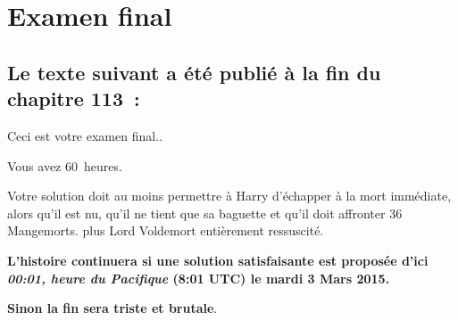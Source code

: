 \chapter{Examen final}

\section{Le texte suivant a été publié à la fin du chapitre 113~:}


\setlength{\parskip}{.5\baselineskip}

Ceci est votre examen final..

Vous avez 60~heures.

Votre solution doit au moins permettre à Harry d'échapper à la mort immédiate,
alors qu'il est nu, qu'il ne tient que sa baguette et qu'il doit affronter 36 Mangemorts.
plus Lord Voldemort entièrement ressuscité.

\textbf{L'histoire continuera si une solution satisfaisante est proposée d'ici \emph{00:01, heure du Pacifique} (8:01 UTC) le mardi 3 Mars 2015.} 

\textbf{Sinon la fin sera triste et brutale}.


